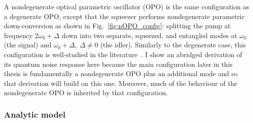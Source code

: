 A nondegenerate optical parametric oscillator (OPO) is the same configuration as a degenerate OPO, except that the squeezer performs nondegenerate parametric down-conversion as shown in Fig.~\ref{fig:nOPO_config}: splitting the pump at frequency $2\omega_0+\Delta$ down into two separate, squeezed, and entangled modes at $\omega_0$ (the signal) and $\omega_0+\Delta,\; \Delta\neq0$ (the idler). Similarly to the degenerate case, this configuration is well-studied in the literature~\cite{}. I show an abridged derivation of its quantum noise response here because the main configuration later in this thesis is fundamentally a nondegenerate OPO plus an additional mode and so that derivation will build on this one. Moreover, much of the behaviour of the nondegenerate OPO is inherited by that configuration. %

\subsubsection{Analytic model}

